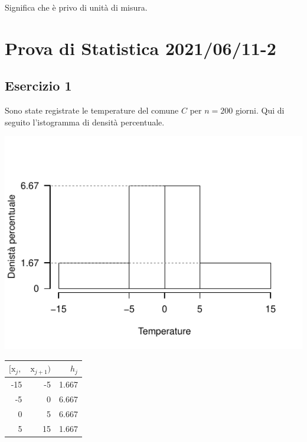 \documentclass[
  11pt,
]{book}
\theoremstyle{mytheoremstyle}
\theoremstyle{mydefstyle}
\newenvironment{sol}
  {
  \begin{tcolorbox}[enhanced,breakable,arc=0.1mm,boxrule=1pt,colback=white,colframe=iblue,
  title=\bf \fontfamily{lmss}\selectfont \hspace{.5 cm} Soluzione,drop fuzzy shadow]

}{
\end{tcolorbox}
  }
\begin{document}
\begin{sol}
Significa che è privo di unità di misura.

\end{sol}

\section{Prova di Statistica 2021/06/11-2}\label{prova-di-statistica-20210611-2}

\subsection{Esercizio 1}\label{esercizio-1-5}

Sono state registrate le temperature del comune \(C\) per \(n=200\) giorni. Qui di seguito l'istogramma di densità percentuale.

\begin{center}\includegraphics{Esami_passati_con_soluzioni_files/figure-latex/2021-46-1} \end{center}

\begin{table}[H]
\centering
\begin{tabular}[t]{rrr}
\toprule
$[\text{x}_j,$ & $\text{x}_{j+1})$ & $h_j$\\
\midrule
-15 & -5 & 1.667\\
-5 & 0 & 6.667\\
0 & 5 & 6.667\\
5 & 15 & 1.667\\
\bottomrule
\end{tabular}
\end{table}
\end{document}
